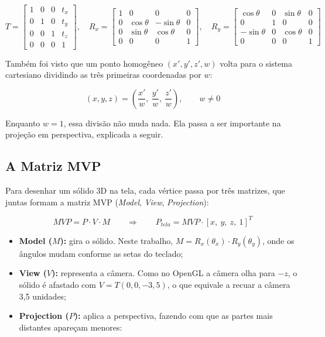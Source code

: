 \documentclass{article}
\begin{document}
\begin{equation}\label{eq:matrizes}
T = \begin{bmatrix} 1 & 0 & 0 & t_x \\ 0 & 1 & 0 & t_y \\ 0 & 0 & 1 & t_z \\ 0 & 0 & 0 & 1 \end{bmatrix}, \quad
R_x = \begin{bmatrix} 1 & 0 & 0 & 0 \\ 0 & \cos\theta & -\sin\theta & 0 \\ 0 & \sin\theta & \cos\theta & 0 \\ 0 & 0 & 0 & 1 \end{bmatrix}, \quad
R_y = \begin{bmatrix} \cos\theta & 0 & \sin\theta & 0 \\ 0 & 1 & 0 & 0 \\ -\sin\theta & 0 & \cos\theta & 0 \\ 0 & 0 & 0 & 1 \end{bmatrix}
\end{equation}

Também foi visto que um ponto homogêneo $(x', y', z', w)$ volta para o sistema cartesiano dividindo as três primeiras coordenadas por $w$:

\begin{equation}\label{eq:divisao}
(x, y, z) = \left(\frac{x'}{w},\ \frac{y'}{w},\ \frac{z'}{w}\right), \qquad w \neq 0
\end{equation}

Enquanto $w = 1$, essa divisão não muda nada. Ela passa a ser importante na projeção em perspectiva, explicada a seguir.

\subsection{A Matriz MVP}

Para desenhar um sólido 3D na tela, cada vértice passa por três matrizes, que juntas formam a matriz MVP (\textit{Model}, \textit{View}, \textit{Projection}):

\begin{equation}\label{eq:mvp}
MVP = P \cdot V \cdot M \qquad \Rightarrow \qquad P_{tela} = MVP \cdot [x,\ y,\ z,\ 1]^T
\end{equation}

\begin{itemize}
    \item \textbf{Model ($M$):} gira o sólido. Neste trabalho, $M = R_x(\theta_x) \cdot R_y(\theta_y)$, onde os ângulos mudam conforme as setas do teclado;
    \item \textbf{View ($V$):} representa a câmera. Como no OpenGL a câmera olha para $-z$, o sólido é afastado com $V = T(0, 0, -3{,}5)$, o que equivale a recuar a câmera 3,5 unidades;
    \item \textbf{Projection ($P$):} aplica a perspectiva, fazendo com que as partes mais distantes apareçam menores:
\end{itemize}
\end{document}
